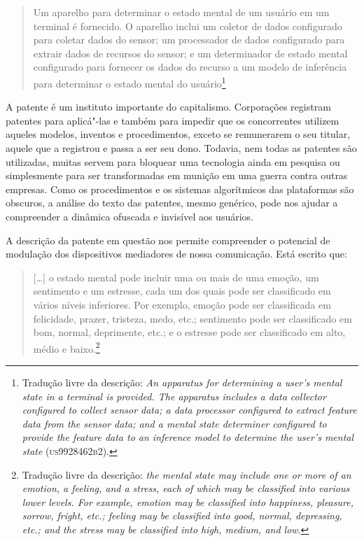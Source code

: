 \begin{quote}
Um aparelho para determinar o estado mental de um usuário em um terminal
é fornecido. O aparelho inclui um coletor de dados configurado para
coletar dados do sensor; um processador de dados configurado para
extrair dados de recursos do sensor; e um determinador de estado mental
configurado para fornecer os dados do recurso a um modelo de inferência
para determinar o estado mental do usuário\footnote{Tradução livre da descrição: \textit{An apparatus for
  determining a user's mental state in a terminal is provided. The
  apparatus includes a data collector configured to collect sensor data;
  a data processor configured to extract feature data from the sensor
  data; and a mental state determiner configured to provide the feature
  data to an inference model to determine the user's mental state}
  (\textsc{us9928462b2}).}
\end{quote}

A patente é um instituto importante do capitalismo. Corporações
registram patentes para aplicá"-las e também para impedir que os
concorrentes utilizem aqueles modelos, inventos e procedimentos, exceto
se remunerarem o seu titular, aquele que a registrou e passa a ser seu
dono. Todavia, nem todas as patentes são utilizadas, muitas servem para
bloquear uma tecnologia ainda em pesquisa ou simplesmente para ser
transformadas em munição em uma guerra contra outras empresas. Como os
procedimentos e os sistemas algorítmicos das plataformas são obscuros, a
análise do texto das patentes, mesmo genérico, pode nos ajudar a
compreender a dinâmica ofuscada e invisível aos usuários.

A descrição da patente em questão nos permite compreender o potencial de
modulação dos dispositivos mediadores de nossa comunicação. Está escrito
que:

\begin{quote}
{[}\ldots{}{]} o estado mental pode incluir uma ou mais de uma emoção, um
sentimento e um estresse, cada um dos quais pode ser classificado em
vários níveis inferiores. Por exemplo, emoção pode ser classificada em
felicidade, prazer, tristeza, medo, etc.; sentimento pode ser
classificado em bom, normal, deprimente, etc.; e o estresse pode ser
classificado em alto, médio e baixo.\footnote{Tradução livre da
  descrição: \textit{the mental state may include one or more of an emotion, a
    feeling, and a stress, each of which may be classified into various
    lower levels. For example, emotion may be classified into happiness,
    pleasure, sorrow, fright, etc.; feeling may be classified into good,
    normal, depressing, etc.; and the stress may be classified into high,
    medium, and low}.}
\end{quote}

